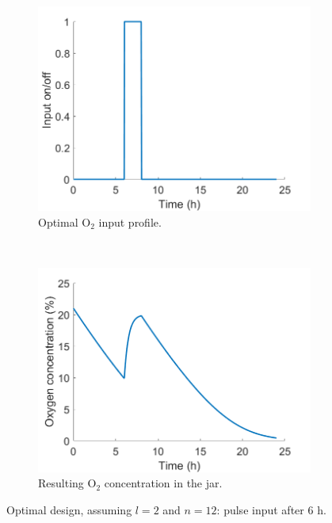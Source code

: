 \begin{figure}
	\centering
	\begin{subfigure}[b]{0.45\textwidth}
		\includegraphics[width=\textwidth]{figure/paper 1/input.png}
		\caption{Optimal $\text{O}_2$ input profile.}
		\label{input1}
	\end{subfigure}
	~ %
	\begin{subfigure}[b]{0.45\textwidth}
		\includegraphics[width=\textwidth]{figure/paper 1/design.png}
		\caption{Resulting $\text{O}_2$ concentration in the jar.}
		\label{output1}
	\end{subfigure}
	\caption{Optimal design, assuming $l=2$ and $n=12$: pulse input after $6 \text{ h}$.}
	\label{figODE1}
\end{figure}
